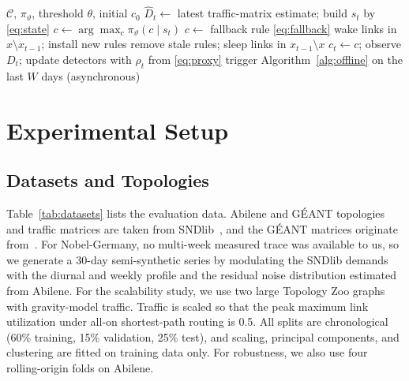 \documentclass[journal]{IEEEtran}
\begin{document}
\begin{algorithm}[t]
\caption{LiRA Online Control Loop}
\label{alg:online}
\footnotesize
\begin{algorithmic}[1]
\Require $\mathcal{C}$, $\pi_\vartheta$, threshold $\theta$, initial $c_0$
\State $\hat{D}_t\gets$ latest traffic-matrix estimate; build $s_t$ by \eqref{eq:state}
\State $c\gets\arg\max_{c}\pi_\vartheta(c\mid s_t)$
\State $c\gets$ fallback rule \eqref{eq:fallback}
\EndIf
{}
\State wake links in $x\setminus x_{t-1}$; install new rules
\State remove stale rules; sleep links in $x_{t-1}\setminus x$
\EndIf
\State $c_t\gets c$; observe $D_t$; update detectors with $\rho_t$ from \eqref{eq:proxy}
\State trigger Algorithm~\ref{alg:offline} on the last $W$ days (asynchronous)
\EndIf
\EndFor
\end{algorithmic}
\end{algorithm}

\section{Experimental Setup}\label{sec:setup}

\subsection{Datasets and Topologies}

Table~\ref{tab:datasets} lists the evaluation data. Abilene and G\'{E}ANT topologies and traffic matrices are taken from SNDlib~\cite{orlowski2010sndlib}, and the G\'{E}ANT matrices originate from~\cite{uhlig2006geant}. For Nobel-Germany, no multi-week measured trace was available to us, so we generate a 30-day semi-synthetic series by modulating the SNDlib demands with the diurnal and weekly profile and the residual noise distribution estimated from Abilene. For the scalability study, we use two large Topology Zoo graphs~\cite{knight2011zoo} with gravity-model traffic. Traffic is scaled so that the peak maximum link utilization under all-on shortest-path routing is 0.5. All splits are chronological (60\% training, 15\% validation, 25\% test), and scaling, principal components, and clustering are fitted on training data only. For robustness, we also use four rolling-origin folds on Abilene.
\end{document}
